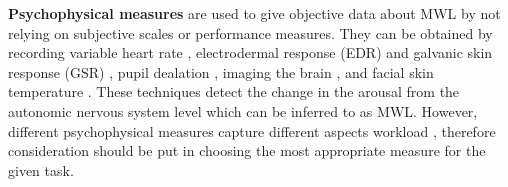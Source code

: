 \documentclass[../main/Feedback.tex]{subfiles}
\begin{document}
%


\textbf{Psychophysical measures} are used to give objective data about MWL by not relying on subjective scales or performance measures.
They can be obtained by recording variable heart rate \cite{backs1994metabolic}, electrodermal response (EDR) and galvanic skin response (GSR) \cite{collet2014measuring,shi2007galvanic}, pupil dealation  \cite{beatty1982task}, imaging the brain \cite{balconi2015hemodynamic}, and facial skin temperature \cite{stemberger2010thermal}.
These techniques detect the change in the arousal from the autonomic nervous system level which can be inferred to as MWL.
However, different psychophysical measures capture different aspects workload \cite{cain2007review}, therefore consideration should be put in choosing the most appropriate measure for the given task.
\end{document}
